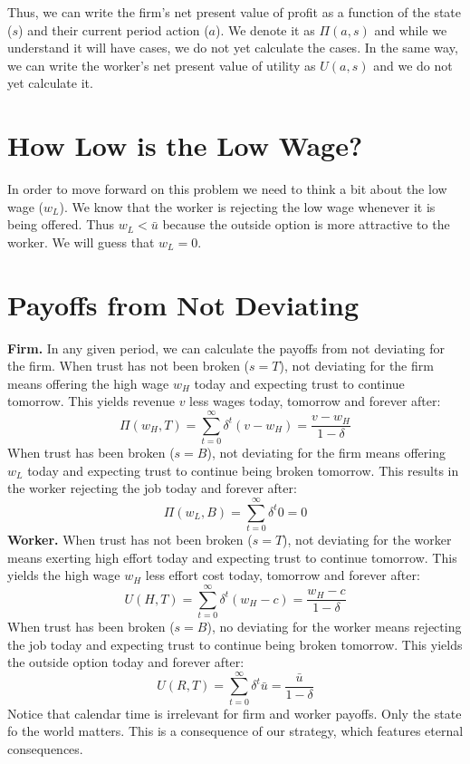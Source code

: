 \documentclass[14pt]{article}
\begin{document}
Thus, we can write the firm's net present value of profit as a function of the state ($s$) and their current period action ($a$). We denote it as $\Pi (a,s)$ and while we understand it will have cases, we do not yet calculate the cases. In the same way, we can write the worker's net present value of utility as $U(a,s)$ and we do not yet calculate it.

\section{How Low is the Low Wage?}
 In order to move forward on this problem we need to think a bit about the low wage ($w_L$). We know that the worker is rejecting the low wage whenever it is being offered. Thus $w_L<\bar u$ because the outside option is more attractive to the worker. We will guess that $w_L=0$.

\section{Payoffs from Not Deviating}

\textbf{Firm.} In any given period, we can calculate the payoffs from not deviating for the firm. When trust has not been broken ($s=T$), not deviating for the firm means offering the high wage $w_H$ today and expecting trust to continue tomorrow. This yields revenue $v$ less wages today, tomorrow and forever after:
\[\Pi(w_H, T) = \sum_{t=0}^{\infty} \delta^t(v-w_H)=\frac{v-w_H}{1-\delta} \]
When trust has been broken ($s=B$), not deviating for the firm means offering $w_L$ today and expecting trust to continue being broken tomorrow. This results in the worker rejecting the job today and forever after:
\[\Pi(w_L,B) = \sum_{t=0}^{\infty} \delta^t 0=0\]
\textbf{Worker.} When trust has not been broken ($s=T$), not deviating for the worker means exerting high effort today and expecting trust to continue tomorrow. This yields the high wage $w_H$ less effort cost today, tomorrow and forever after:
\[U(H, T) = \sum_{t=0}^{\infty} \delta^t(w_H-c)=\frac{w_H-c}{1-\delta} \]
When trust has been broken ($s=B$), no deviating for the worker means rejecting the job today and expecting trust to continue being broken tomorrow. This yields the outside option today and forever after:
\[U(R, T) = \sum_{t=0}^{\infty} \delta^t \bar u=\frac{\bar u}{1-\delta} \]
Notice that calendar time is irrelevant for firm and worker payoffs. Only the state fo the world matters. This is a consequence of our strategy, which features eternal consequences.
\end{document}
